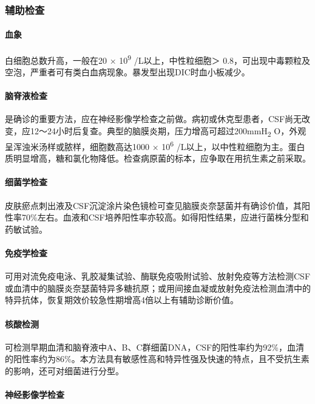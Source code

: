 \subsubsection{辅助检查}

\paragraph{血象}

白细胞总数升高，一般在20 × 10\textsuperscript{9} /L以上，中性粒细胞＞
0.8，可出现中毒颗粒及空泡，严重者可有类白血病现象。暴发型出现DIC时血小板减少。

\paragraph{脑脊液检查}

是确诊的重要方法，应在神经影像学检查之前做。病初或休克型患者，CSF尚无改变，应12～24小时后复查。典型的脑膜炎期，压力增高可超过200mmH\textsubscript{2}
O，外观呈浑浊米汤样或脓样，细胞数高达1000 × 10\textsuperscript{6}
/L以上，以中性粒细胞为主。蛋白质明显增高，糖和氯化物降低。检查病原菌的标本，应争取在用抗生素之前采取。

\paragraph{细菌学检查}

皮肤瘀点刺出液及CSF沉淀涂片染色镜检可查见脑膜炎奈瑟菌并有确诊价值，其阳性率70\%左右。血液和CSF培养阳性率亦较高。如得阳性结果，应进行菌株分型和药敏试验。

\paragraph{免疫学检查}

可用对流免疫电泳、乳胶凝集试验、酶联免疫吸附试验、放射免疫等方法检测CSF或血清中的脑膜炎奈瑟菌特异多糖抗原；或用间接血凝或放射免疫法检测血清中的特异抗体，恢复期效价较急性期增高4倍以上有辅助诊断价值。

\paragraph{核酸检测}

可检测早期血清和脑脊液中A、B、C群细菌DNA，CSF的阳性率约为92\%，血清的阳性率约为86\%。本方法具有敏感性高和特异性强及快速的特点，且不受抗生素的影响，还可对细菌进行分型。

\paragraph{神经影像学检查}

